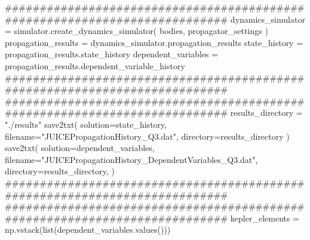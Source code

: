 {}
\markdownRendererSectionEnd \markdownRendererSectionBegin
{}\markdownRendererInterblockSeparator
{}###########################################################################\markdownRendererInterblockSeparator
{}
\markdownRendererSectionEnd \markdownRendererSectionBegin
{}\markdownRendererInterblockSeparator
{}dynamics_simulator = simulator.create_dynamics_simulator( bodies, propagator_settings )\markdownRendererInterblockSeparator
{}
\markdownRendererSectionEnd \markdownRendererSectionBegin
{}\markdownRendererInterblockSeparator
{}propagation_results = dynamics_simulator.propagation_results\markdownRendererInterblockSeparator
{}
\markdownRendererSectionEnd \markdownRendererSectionBegin
{}\markdownRendererInterblockSeparator
{}state_history = propagation_results.state_history dependent_variables = propagation_results.dependent_variable_history\markdownRendererInterblockSeparator
{}###########################################################################\markdownRendererInterblockSeparator
{}
\markdownRendererSectionEnd \markdownRendererSectionBegin
{}\markdownRendererInterblockSeparator
{}########################################################################### results_directory = "./results" save2txt( solution=state_history, filename="JUICEPropagationHistory_Q3.dat", directory=results_directory ) save2txt( solution=dependent_variables, filename="JUICEPropagationHistory_DependentVariables_Q3.dat", directory=results_directory, )\markdownRendererInterblockSeparator
{}###########################################################################\markdownRendererInterblockSeparator
{}
\markdownRendererSectionEnd \markdownRendererSectionBegin
{}\markdownRendererInterblockSeparator
{}###########################################################################\markdownRendererInterblockSeparator
{}
\markdownRendererSectionEnd \markdownRendererSectionBegin
{}\markdownRendererInterblockSeparator
{}kepler_elements = np.vstack(list(dependent_variables.values()))\markdownRendererInterblockSeparator
{}
\markdownRendererSectionEnd \markdownRendererSectionBegin
{}\markdownRendererInterblockSeparator
